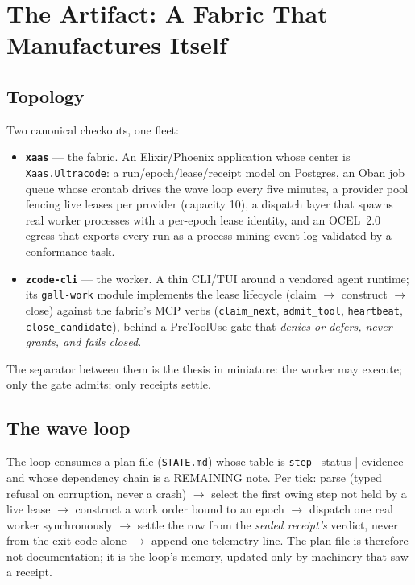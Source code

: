 \documentclass[11pt,a4paper]{article}
\theoremstyle{remark}
\newcommand{\term}[1]{\texttt{#1}}
\begin{document}
\section{The Artifact: A Fabric That Manufactures Itself}

\subsection{Topology}
Two canonical checkouts, one fleet:
\begin{itemize}
\item \textbf{\term{xaas}} --- the fabric. An Elixir/Phoenix application whose center is \term{Xaas.Ultracode}: a run/epoch/lease/receipt model on Postgres, an Oban job queue whose crontab drives the wave loop every five minutes, a provider pool fencing live leases per provider (capacity 10), a dispatch layer that spawns real worker processes with a per-epoch lease identity, and an OCEL~2.0 egress that exports every run as a process-mining event log validated by a conformance task.
\item \textbf{\term{zcode-cli}} --- the worker. A thin CLI/TUI around a vendored agent runtime; its \term{gall-work} module implements the lease lifecycle (claim $\to$ construct $\to$ close) against the fabric's MCP verbs (\term{claim\_next}, \term{admit\_tool}, \term{heartbeat}, \term{close\_candidate}), behind a PreToolUse gate that \emph{denies or defers, never grants, and fails closed}.
\end{itemize}
The separator between them is the thesis in miniature: the worker may execute; only the gate admits; only receipts settle.

\subsection{The wave loop}
The loop consumes a plan file (\term{STATE.md}) whose table is \verb|step | status | evidence| and whose dependency chain is a REMAINING note. Per tick: parse (typed refusal on corruption, never a crash) $\to$ select the first owing step not held by a live lease $\to$ construct a work order bound to an epoch $\to$ dispatch one real worker synchronously $\to$ settle the row from the \emph{sealed receipt's} verdict, never from the exit code alone $\to$ append one telemetry line. The plan file is therefore not documentation; it is the loop's memory, updated only by machinery that saw a receipt.
\end{document}
